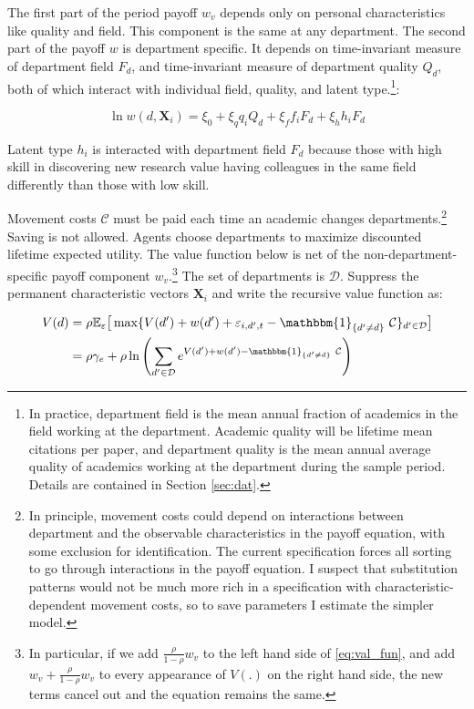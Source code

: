 The first part of the period payoff $w_v$ depends only
on personal characteristics like quality and field. This component is the 
same at any department.  The second part of the payoff
$w$ is department specific. It depends on time-invariant measure of department
field $F_d$, and time-invariant measure of department quality $Q_d$, both of which interact with
individual field, quality, and latent type.\footnote{In practice, department 
field is the mean annual fraction of academics in the field working at the department.  Academic 
quality will be lifetime mean citations per paper, and department quality is the mean 
annual average quality of academics working at the department
during the sample period.  Details are contained in Section \ref{sec:dat}.}:

\begin{equation}
    \ln w(d, \mathbf{X}_i) = \xi_0  + \xi_q q_i Q_d + \xi_f f_i F_d + \xi_h h_i F_d
    \label{eq:horz_wage}
\end{equation} 

Latent type $h_i$ is interacted with department field $F_d$ because those with high
skill in discovering new research value having colleagues
in the same field differently than those with low skill.

Movement costs $\mathcal{C}$ must be paid each time an academic changes departments.\footnote{In principle, movement costs could depend on interactions between department and the observable characteristics in the payoff equation, with some exclusion for identification.  The current specification forces all sorting to go through interactions in the payoff equation.  I suspect that substitution patterns would not be much more rich in a specification with characteristic-dependent movement costs, so to save parameters I estimate the simpler model.} Saving is not allowed. Agents choose departments to maximize discounted lifetime expected utility.
The value function below is net of the non-department-specific payoff component $w_v$.\footnote{In particular, if we add $\frac{\rho}{1 - \rho} w_v$ to the left hand side of \eqref{eq:val_fun}, and add $w_v + \frac{\rho}{1 - \rho} w_v$ to every appearance of $V(.)$ on the right hand side, the new terms cancel out and the equation remains the same.}
The set of departments is $\mathcal{D}$.
Suppress the permanent characteristic vectors $\mathbf{X}_i$ and write the
recursive value function as:

\begin{align}
    V(d) &= \rho \mathbb{E}_\varepsilon \big[\max\{V(d') + w(d') + \varepsilon_{i,d',t} - \mathbbm{1}_{\{d'\neq d\}} \ \mathcal{C}\}_{d'\in \mathcal{D}}\big] \nonumber \\
    &= \rho \gamma_e + \rho \ln\left( \sum_{d' \in \mathcal{D}} e^{V(d') + w(d') - \mathbbm{1}_{\{d'\neq d\}} \ \mathcal{C}} \right)
    \label{eq:val_fun}
\end{align}

